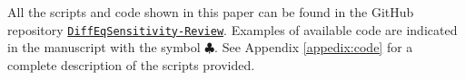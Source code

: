 All the scripts and code shown in this paper can be found in the GitHub repository \href{https://github.com/ODINN-SciML/DiffEqSensitivity-Review}{\texttt{DiffEqSensitivity-Review}}. 
Examples of available code are indicated in the manuscript with the symbol $\clubsuit$.
See Appendix \ref{appedix:code} for a complete description of the scripts provided. 